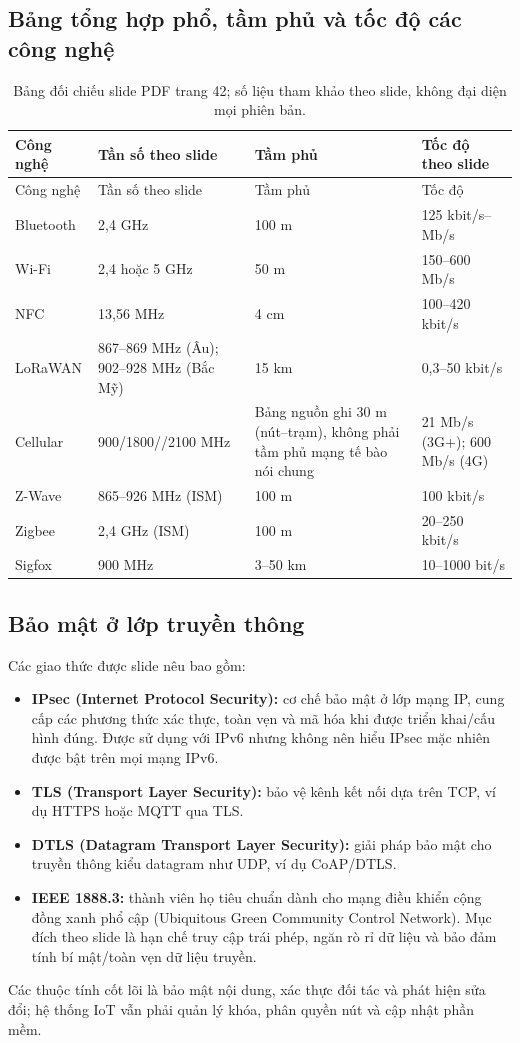 \subsection{Bảng tổng hợp phổ, tầm phủ và tốc độ các công nghệ}
\begingroup\small\sloppy\begin{longtable}{p{2.6cm}p{3.5cm}p{2.25cm}p{3.6cm}}
\caption{Bảng đối chiếu slide PDF trang 42; số liệu tham khảo theo slide, không đại diện mọi phiên bản.}\\
\toprule Công nghệ & Tần số theo slide & Tầm phủ & Tốc độ theo slide\\\midrule\endfirsthead
\toprule Công nghệ & Tần số theo slide & Tầm phủ & Tốc độ\\\midrule\endhead
Bluetooth & 2,4 GHz & 100 m & 125 kbit/s--Mb/s\\
Wi-Fi & 2,4 hoặc 5 GHz & 50 m & 150--600 Mb/s\\
NFC & 13,56 MHz & 4 cm & 100--420 kbit/s\\
LoRaWAN & 867--869 MHz (Âu); 902--928 MHz (Bắc Mỹ) & 15 km & 0,3--50 kbit/s\\
Cellular & 900/1800/\allowbreak 1900/2100 MHz & Bảng nguồn ghi 30 m (nút--trạm), không phải tầm phủ mạng tế bào nói chung & 21 Mb/s (3G+); 600 Mb/s (4G)\\
Z-Wave & 865--926 MHz (ISM) & 100 m & 100 kbit/s\\
Zigbee & 2,4 GHz (ISM) & 100 m & 20--250 kbit/s\\
Sigfox & 900 MHz & 3--50 km & 10--1000 bit/s\\\bottomrule
\end{longtable}\endgroup

\subsection{Bảo mật ở lớp truyền thông}
Các giao thức được slide nêu bao gồm:
\begin{itemize}
\item \textbf{IPsec (Internet Protocol Security):} cơ chế bảo mật ở lớp mạng IP, cung cấp các phương thức xác thực, toàn vẹn và mã hóa khi được triển khai/cấu hình đúng. Được sử dụng với IPv6 nhưng không nên hiểu IPsec mặc nhiên được bật trên mọi mạng IPv6.
\item \textbf{TLS (Transport Layer Security):} bảo vệ kênh kết nối dựa trên TCP, ví dụ HTTPS hoặc MQTT qua TLS.
\item \textbf{DTLS (Datagram Transport Layer Security):} giải pháp bảo mật cho truyền thông kiểu datagram như UDP, ví dụ CoAP/DTLS.
\item \textbf{IEEE 1888.3:} thành viên họ tiêu chuẩn dành cho mạng điều khiển cộng đồng xanh phổ cập (Ubiquitous Green Community Control Network). Mục đích theo slide là hạn chế truy cập trái phép, ngăn rò rỉ dữ liệu và bảo đảm tính bí mật/toàn vẹn dữ liệu truyền.
\end{itemize}
Các thuộc tính cốt lõi là bảo mật nội dung, xác thực đối tác và phát hiện sửa đổi; hệ thống IoT vẫn phải quản lý khóa, phân quyền nút và cập nhật phần mềm. 

